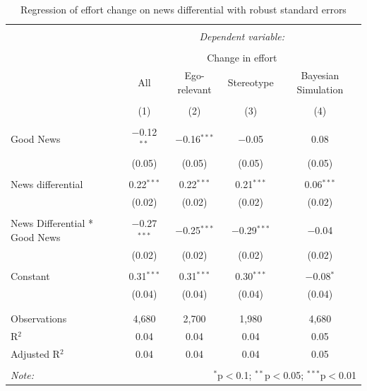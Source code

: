 \documentclass[
  12pt,
]{article}
\begin{document}
\begin{table}[!htbp] \centering 
  \caption{Regression of effort change on news differential with robust standard errors} 
  \label{tab:regression} 
\begin{tabular}{@{\extracolsep{5pt}}lcccc} 
\\[-1.8ex]\hline 
\hline \\[-1.8ex] 
 & \multicolumn{4}{c}{\textit{Dependent variable:}} \\ 
\cline{2-5} 
\\[-1.8ex] & \multicolumn{4}{c}{Change in effort} \\ 
 & All & Ego-relevant & Stereotype & Bayesian Simulation \\ 
\\[-1.8ex] & (1) & (2) & (3) & (4)\\ 
\hline \\[-1.8ex] 
 Good News & $-$0.12$^{**}$ & $-$0.16$^{***}$ & $-$0.05 & 0.08 \\ 
  & (0.05) & (0.05) & (0.05) & (0.05) \\ 
  & & & & \\ 
 News differential & 0.22$^{***}$ & 0.22$^{***}$ & 0.21$^{***}$ & 0.06$^{***}$ \\ 
  & (0.02) & (0.02) & (0.02) & (0.02) \\ 
  & & & & \\ 
 News Differential * Good News & $-$0.27$^{***}$ & $-$0.25$^{***}$ & $-$0.29$^{***}$ & $-$0.04 \\ 
  & (0.02) & (0.02) & (0.02) & (0.02) \\ 
  & & & & \\ 
 Constant & 0.31$^{***}$ & 0.31$^{***}$ & 0.30$^{***}$ & $-$0.08$^{*}$ \\ 
  & (0.04) & (0.04) & (0.04) & (0.04) \\ 
  & & & & \\ 
\hline \\[-1.8ex] 
Observations & 4,680 & 2,700 & 1,980 & 4,680 \\ 
R$^{2}$ & 0.04 & 0.04 & 0.04 & 0.05 \\ 
Adjusted R$^{2}$ & 0.04 & 0.04 & 0.04 & 0.05 \\ 
\hline 
\hline \\[-1.8ex] 
\textit{Note:}  & \multicolumn{4}{r}{$^{*}$p$<$0.1; $^{**}$p$<$0.05; $^{***}$p$<$0.01} \\ 
\end{tabular} 
\end{table}
\end{document}
